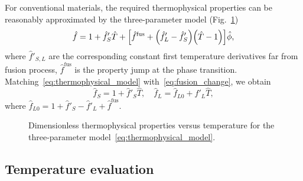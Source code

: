 \documentclass{article}
\newcommand{\fusion}[1]{{#1}^\mathrm{fus}}
\newcommand{\HT}{\hat{T}}
\newcommand{\Hf}{\hat{f}}
\newcommand{\Hphi}{\hat{\phi}}
\begin{document}
For conventional materials, the required thermophysical properties can be reasonably approximated
by the three-parameter model (Fig.~\ref{fig:thermophysical})
\begin{equation}\label{eq:thermophysical_model}
	\Hf = 1 + \Hf'_S\HT + \qty[
	    \fusion{\Hf} + \qty(\Hf'_L-\Hf'_S) \qty(\HT-1)
	]\Hphi,
\end{equation}
where \(\Hf'_{S,L}\) are the corresponding constant first temperature derivatives far from fusion process,
\(\fusion{\Hf}\) is the property jump at the phase transition.
Matching~\eqref{eq:thermophysical_model} with~\eqref{eq:fusion_change}, we obtain
\begin{equation}\label{eq:thermophysical_model_explicit}
	\Hf_S = 1 + \Hf'_S\HT, \quad
	\Hf_L = \Hf_{L0} + \Hf'_L\HT,
\end{equation}
where \(\Hf_{L0} = 1 + \Hf'_S - \Hf'_L + \fusion{\Hf}\).

\begin{figure}
    \centering
    \caption{Dimensionless thermophysical properties versus temperature for the three-parameter model~\eqref{eq:thermophysical_model}.}
    \label{fig:thermophysical}
\end{figure}

\subsection{Temperature evaluation}
\end{document}
